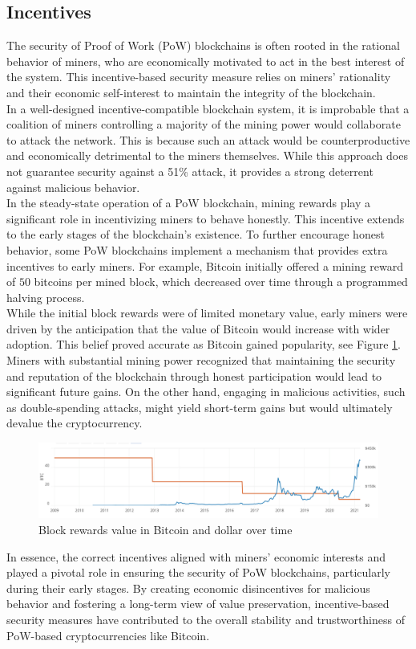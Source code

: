 \documentclass{report}
\begin{document}
\subsection{Incentives}
The security of Proof of Work (PoW) blockchains is often rooted in the rational behavior of miners, who are economically motivated to act in the best interest of the system. This incentive-based security measure relies on miners' rationality and their economic self-interest to maintain the integrity of the blockchain.\\
In a well-designed incentive-compatible blockchain system, it is improbable that a coalition of miners controlling a majority of the mining power would collaborate to attack the network. This is because such an attack would be counterproductive and economically detrimental to the miners themselves. While this approach does not guarantee security against a 51\% attack, it provides a strong deterrent against malicious behavior.\\
In the steady-state operation of a PoW blockchain, mining rewards play a significant role in incentivizing miners to behave honestly. This incentive extends to the early stages of the blockchain's existence. To further encourage honest behavior, some PoW blockchains implement a mechanism that provides extra incentives to early miners. For example, Bitcoin initially offered a mining reward of $50$ bitcoins per mined block, which decreased over time through a programmed halving process.\\
While the initial block rewards were of limited monetary value, early miners were driven by the anticipation that the value of Bitcoin would increase with wider adoption. This belief proved accurate as Bitcoin gained popularity, see Figure \ref{fig:f1}. Miners with substantial mining power recognized that maintaining the security and reputation of the blockchain through honest participation would lead to significant future gains. On the other hand, engaging in malicious activities, such as double-spending attacks, might yield short-term gains but would ultimately devalue the cryptocurrency.\\
\begin{center}
	\begin{figure}
		\centering
		\includegraphics[width=0.8\linewidth]{Fig/F1}
		\caption{Block rewards value in Bitcoin and dollar over time}
		\label{fig:f1}
	\end{figure}
\end{center}
In essence, the correct incentives aligned with miners' economic interests and played a pivotal role in ensuring the security of PoW blockchains, particularly during their early stages. By creating economic disincentives for malicious behavior and fostering a long-term view of value preservation, incentive-based security measures have contributed to the overall stability and trustworthiness of PoW-based cryptocurrencies like Bitcoin.
\end{document}
